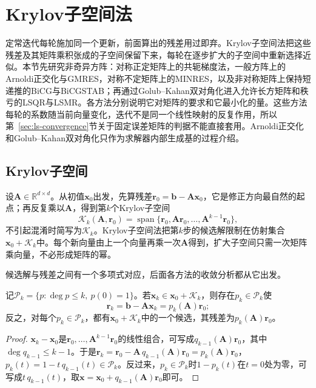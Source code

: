 \section{Krylov子空间法}
\label{sec:ls-krylov-iterations}

定常迭代每轮施加同一个更新，前面算出的残差用过即弃。Krylov子空间法把这些残差及其矩阵乘积张成的子空间保留下来，每轮在逐步扩大的子空间中重新选择近似。本节先研究非奇异方阵：对称正定矩阵上的共轭梯度法，一般方阵上的Arnoldi正交化与GMRES，对称不定矩阵上的MINRES，以及非对称矩阵上保持短递推的BiCG与BiCGSTAB；再通过Golub--Kahan双对角化进入允许长方矩阵和秩亏的LSQR与LSMR。各方法分别说明它对矩阵的要求和它最小化的量。这些方法每轮的系数随当前向量变化，迭代不是同一个线性映射的反复作用，所以第~\ref{sec:ls-convergence}节关于固定误差矩阵的判据不能直接套用。Arnoldi正交化和Golub--Kahan双对角化只作为求解器内部生成基的过程介绍。

\subsection{Krylov子空间}
\label{sec:ls-krylov-subspaces}

设$\bm A\in\mathbb R^{d\times d}$。从初值$\bm x_0$出发，先算残差$\bm r_0=\bm b-\bm A\bm x_0$，它是修正方向最自然的起点；再反复乘以$\bm A$，得到第$k$个Krylov子空间
\[
 \mathcal K_k(\bm A,\bm r_0)=\operatorname{span}\{\bm r_0,\bm A\bm r_0,\ldots,\bm A^{k-1}\bm r_0\},
\]
不引起混淆时简写为$\mathcal K_k$。Krylov子空间法把第$k$步的候选解限制在仿射集合$\bm x_0+\mathcal K_k$中。每个新向量由上一个向量再乘一次$\bm A$得到，扩大子空间只需一次矩阵乘向量，不必形成矩阵的幂。

候选解与残差之间有一个多项式对应，后面各方法的收敛分析都从它出发。

\begin{lemma}[Krylov残差多项式]
\label{lem:ls-krylov-residual-polynomial}
记$\mathcal P_k=\{p:\deg p\le k,\ p(0)=1\}$。若$\bm x_k\in\bm x_0+\mathcal K_k$，则存在$p_k\in\mathcal P_k$使
\begin{equation}
 \label{eq:ls-krylov-residual-polynomial}
 \bm r_k=\bm b-\bm A\bm x_k=p_k(\bm A)\bm r_0 ;
\end{equation}
反之，对每个$p_k\in\mathcal P_k$，都有$\bm x_0+\mathcal K_k$中的一个候选，其残差为$p_k(\bm A)\bm r_0$。
\end{lemma}

\begin{proof}
$\bm x_k-\bm x_0$是$\bm r_0,\ldots,\bm A^{k-1}\bm r_0$的线性组合，可写成$q_{k-1}(\bm A)\bm r_0$，其中$\deg q_{k-1}\le k-1$。于是$\bm r_k=\bm r_0-\bm A\,q_{k-1}(\bm A)\bm r_0=p_k(\bm A)\bm r_0$，$p_k(t)=1-t\,q_{k-1}(t)\in\mathcal P_k$。反过来，$p_k\in\mathcal P_k$时$1-p_k(t)$在$t=0$处为零，可写成$t\,q_{k-1}(t)$，取$\bm x=\bm x_0+q_{k-1}(\bm A)\bm r_0$即可。
\end{proof}

